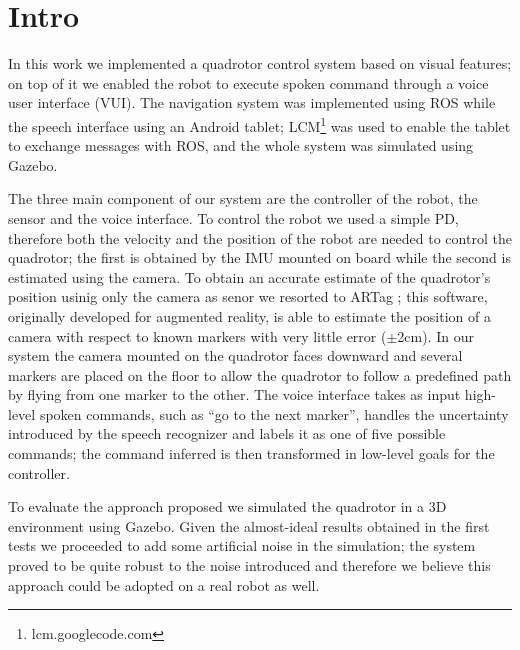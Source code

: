 \section{Intro}

In this work we implemented a quadrotor control system based on visual features;
on top of it we enabled the robot to execute spoken command through a voice
user interface (VUI). The navigation system was implemented using ROS while the
speech interface using an Android tablet; LCM\footnote{lcm.googlecode.com} was
used to enable the tablet to exchange messages with ROS, and the whole system
was simulated using Gazebo.


The three main component of our system are the controller of the robot, the
sensor and the voice interface. To control the robot we used a simple PD,
therefore both the velocity and the position of the robot are needed to control
the quadrotor; the first is obtained by the IMU mounted on board while the
second is estimated using the camera. To obtain an accurate estimate of the
quadrotor's position usinig only the camera as senor we resorted to ARTag
\cite{ARTag}; this software, originally developed for augmented reality, is
able to estimate the position of a camera with respect to known markers with
very little error ($\pm$2cm). In our system the camera mounted on the quadrotor
faces downward and several markers are placed on the floor to allow the
quadrotor to follow a predefined path by flying from one marker to the other.
The voice interface takes as input high-level spoken commands, such as ``go to
the next marker'', handles the uncertainty introduced by the speech recognizer
and labels it as one of five possible commands; the command inferred is then
transformed in low-level goals for the controller.

To evaluate the approach proposed we simulated the quadrotor in a 3D
environment using Gazebo. Given the almost-ideal results obtained in the first
tests we proceeded to add some artificial noise in the simulation; the system
proved to be quite robust to the noise introduced and therefore we believe this
approach could be adopted on a real robot as well.
